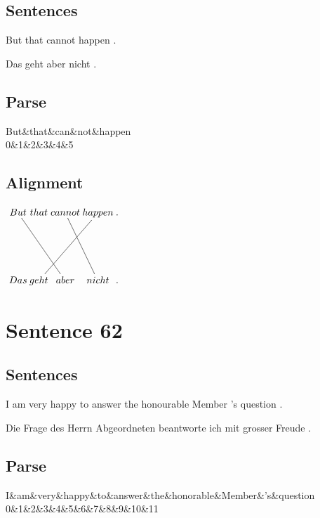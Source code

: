 \documentclass{report}
\begin{document}
\subsection*{Sentences}
But that cannot happen .

\noindent Das geht aber nicht .



\subsection*{Parse}
\begin{dependency}[theme=simple]
\begin{deptext}[column sep=.5cm, row sep=.1ex]
But\&that\&can\&not\&happen\\
0\&1\&2\&3\&4\&5\\
\end{deptext}
\end{dependency}


\subsection*{Alignment}
\scriptsize{
$
\xymatrix@C-2.3pc{
But \ar @{-} [ddrr] & that & cannot \ar @{-} [ddr] & happen \ar @{-} [ddll] & .\\\\
Das & geht & aber & nicht & .
}$}
\newpage\section*{Sentence 62}

\subsection*{Sentences}
I am very happy to answer the honourable Member 's question .

\noindent Die Frage des Herrn Abgeordneten beantworte ich mit grosser Freude .



\subsection*{Parse}
\begin{dependency}[theme=simple]
\begin{deptext}[column sep=.5cm, row sep=.1ex]
I\&am\&very\&happy\&to\&answer\&the\&honorable\&Member\&'s\&question\\
0\&1\&2\&3\&4\&5\&6\&7\&8\&9\&10\&11\\
\end{deptext}
\end{dependency}
\end{document}
